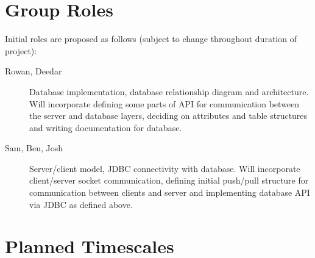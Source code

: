 \documentclass[a4paper,10pt]{article}
\begin{document}
\section{Group Roles}
\label{sec:group_roles}

Initial roles are proposed as follows (subject to change throughout duration of
project):
\begin{description}
	\item[Rowan, Deedar] Database implementation, database relationship diagram
		and architecture. Will incorporate defining some parts of API for
		communication between the server and database layers, deciding on
		attributes and table structures and writing documentation for database.
	\item[Sam, Ben, Josh] Server/client model, JDBC connectivity with database.
		Will incorporate client/server socket communication, defining initial
		push/pull structure for communication between clients and server and
		implementing database API via JDBC as defined above.
\end{description}

\section{Planned Timescales}
\label{sec:planned_timescales}
\end{document}
